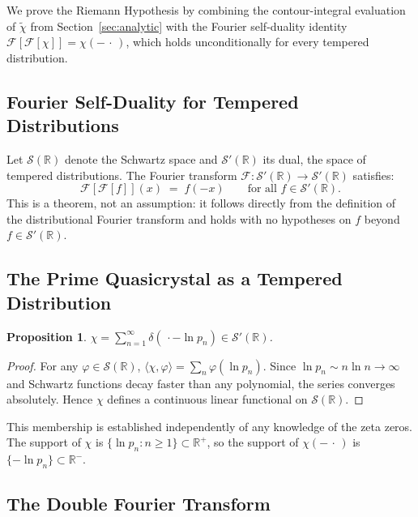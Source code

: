\documentclass[11pt, oneside]{article}
\newtheorem{proposition}[theorem]{Proposition}
\theoremstyle{definition}
\begin{document}
We prove the Riemann Hypothesis by combining the contour-integral
evaluation of $\tilde{\chi}$ from Section~\ref{sec:analytic}
with the Fourier self-duality identity
$\mathcal{F}[\mathcal{F}[\chi]] = \chi(-\,\cdot\,)$,
which holds unconditionally for every tempered distribution.

\subsection{Fourier Self-Duality for Tempered Distributions}

Let $\mathcal{S}(\mathbb{R})$ denote the Schwartz space and
$\mathcal{S}'(\mathbb{R})$ its dual, the space of tempered
distributions.
The Fourier transform
$\mathcal{F}:\mathcal{S}'(\mathbb{R})\to\mathcal{S}'(\mathbb{R})$
satisfies:
\begin{equation}
  \mathcal{F}[\mathcal{F}[f]](x) \;=\; f(-x)
  \qquad\text{for all } f\in\mathcal{S}'(\mathbb{R}).
  \label{eq:selfdual}
\end{equation}
This is a theorem, not an assumption: it follows directly from
the definition of the distributional Fourier transform and holds
with no hypotheses on $f$ beyond $f \in \mathcal{S}'(\mathbb{R})$.

\subsection{The Prime Quasicrystal as a Tempered Distribution}

\begin{proposition}
$\chi = \sum_{n=1}^\infty \delta(\,\cdot - \ln p_n)
\in \mathcal{S}'(\mathbb{R})$.
\end{proposition}
\begin{proof}
For any $\varphi \in \mathcal{S}(\mathbb{R})$,
$\langle\chi, \varphi\rangle = \sum_n \varphi(\ln p_n)$.
Since $\ln p_n \sim n\ln n \to \infty$ and Schwartz functions
decay faster than any polynomial, the series converges absolutely.
Hence $\chi$ defines a continuous linear functional on
$\mathcal{S}(\mathbb{R})$.
\end{proof}

This membership is established independently of any knowledge of
the zeta zeros. The support of $\chi$ is
$\{\ln p_n : n \geq 1\} \subset \mathbb{R}^+$,
so the support of $\chi(-\,\cdot\,)$ is
$\{-\ln p_n\} \subset \mathbb{R}^-$.

\subsection{The Double Fourier Transform}
\end{document}
